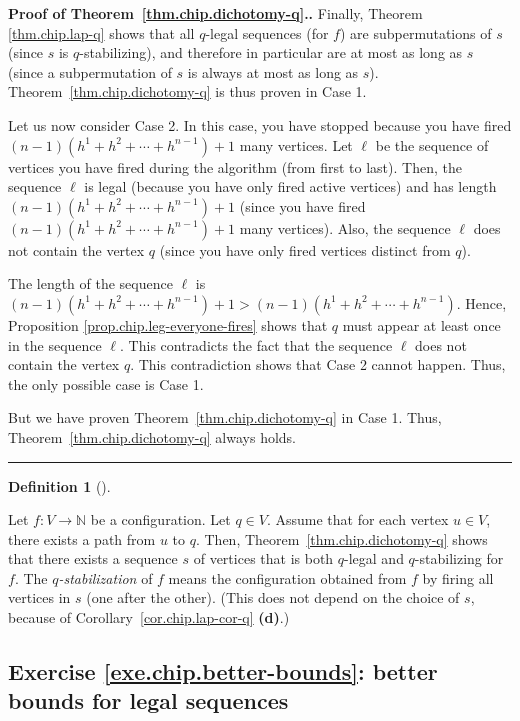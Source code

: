 \documentclass[numbers=enddot,12pt,final,onecolumn,notitlepage]{scrartcl}%
\theoremstyle{definition}
\newtheorem{defi}[theo]{Definition}
\newenvironment{definition}[1][]
{\begin{defi}[#1]\begin{leftbar}}
{\end{leftbar}\end{defi}}
\newenvironment{proof}[1][Proof]{\noindent\textbf{#1.} }{\ \rule{0.5em}{0.5em}}
\newcommand{\NN}{\mathbb{N}}
\begin{document}
\begin{proof}[Proof of Theorem~\ref{thm.chip.dichotomy-q}.]
Finally, Theorem \ref{thm.chip.lap-q} shows that all $q$-legal sequences (for
$f$) are subpermutations of $s$ (since $s$ is $q$-stabilizing), and therefore
in particular are at most as long as $s$ (since a subpermutation of $s$ is
always at most as long as $s$). Theorem~\ref{thm.chip.dichotomy-q} is thus
proven in Case 1.

Let us now consider Case 2. In this case, you have stopped because you have
fired $\left(  n-1\right)  \left(  h^{1}+h^{2}+\cdots+h^{n-1}\right) +1 $ many
vertices. Let $\ell$ be the sequence of vertices you have fired during the
algorithm (from first to last). Then, the sequence $\ell$ is legal (because
you have only fired active vertices) and has length $\left(  n-1\right)
\left(  h^{1}+h^{2}+\cdots+h^{n-1}\right) +1 $ (since you have fired $\left(
n-1\right)  \left(  h^{1}+h^{2}+\cdots+h^{n-1}\right) +1 $ many vertices).
Also, the sequence $\ell$ does not contain the vertex $q$ (since you have only
fired vertices distinct from $q$).

The length of the sequence $\ell$ is \newline
$\left(  n-1\right)  \left(  h^{1}%
+h^{2}+\cdots+h^{n-1}\right)  +1>\left(  n-1\right)  \left(  h^{1}%
+h^{2}+\cdots+h^{n-1}\right)  $. Hence, Proposition
\ref{prop.chip.leg-everyone-fires} shows that $q$ must appear at least once in
the sequence $\ell$. This contradicts the fact that the sequence $\ell$ does
not contain the vertex $q$. This contradiction shows that Case 2 cannot
happen. Thus, the only possible case is Case 1.

But we have proven Theorem~\ref{thm.chip.dichotomy-q} in Case 1. Thus,
Theorem~\ref{thm.chip.dichotomy-q} always holds.
\end{proof}

\begin{definition}
Let $f : V \to \NN$ be a configuration.
Let $q \in V$.
Assume that for each vertex $u \in V$, there exists a path
from $u$ to $q$.
Then, Theorem~\ref{thm.chip.dichotomy-q} shows that
there exists a sequence $s$ of vertices that is both
$q$-legal and $q$-stabilizing for $f$.
The \textit{$q$-stabilization} of $f$ means
the configuration obtained from $f$ by firing
all vertices in $s$ (one after the other).
(This does not depend on the choice of $s$, because of
Corollary~\ref{cor.chip.lap-cor-q} \textbf{(d)}.)
\end{definition}


\subsection{Exercise \ref{exe.chip.better-bounds}: better
bounds for legal sequences}
\end{document}

